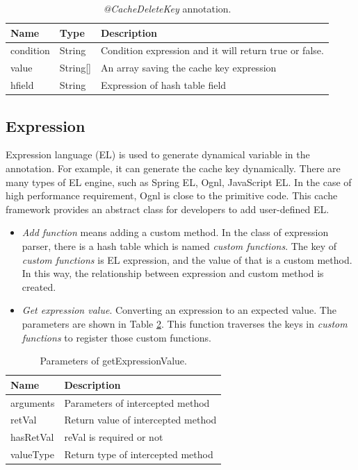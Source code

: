 \documentclass{singlecol-new}
\theoremstyle{TH}{
\newtheorem{lemma}{Lemma}
\newtheorem{theorem}[lemma]{Theorem}
\newtheorem{corrolary}[lemma]{Corrolary}
\newtheorem{conjecture}[lemma]{Conjecture}
\newtheorem{proposition}[lemma]{Proposition}
\newtheorem{claim}[lemma]{Claim}
\newtheorem{stheorem}[lemma]{Wrong Theorem}
}
\theoremstyle{THrm}{
\newtheorem{definition}{Definition}[section]
\newtheorem{question}{Question}[section]
\newtheorem{remark}{Remark}
\newtheorem{scheme}{Scheme}
}
\theoremstyle{THhit}{
\newtheorem{case}{Case}[section]
}
\begin{document}
\begin{table}[htb]
\begin{center}
 \caption{\label{CacheDeleteKey}\textit{@CacheDeleteKey} annotation.}
 \begin{tabular}{lll}
 \toprule
Name & Type & Description\\
 \midrule
condition & String & Condition expression and it will return true or false.\\ %
value & String[] & An array saving the cache key expression\\
hfield & String & Expression of hash table field\\
\bottomrule
 \end{tabular}
\end{center}
\end{table}

\subsection{Expression}
Expression language (EL) is used to generate dynamical variable in the annotation. For example, it can generate the cache key dynamically. There are many types of EL engine, such as Spring EL, Ognl, JavaScript EL. In the case of high performance requirement, Ognl is close to the primitive code. This cache framework provides an abstract class for developers to add user-defined EL.

\begin{itemize}
  \item \textit{Add function} means adding a custom method. In the class of expression parser, there is a hash table which is named \textit{custom functions}. The key of \textit{custom functions} is EL expression, and the value of that is a custom method. In this way, the relationship between expression and custom method is created.
  \item \textit{Get expression value}. Converting an expression to an expected value. The parameters are shown in Table \ref{getExpressionValue}. This function traverses the keys in \textit{custom functions} to register those custom functions.
\end{itemize}

\begin{table}[htb]
\begin{center}
 \caption{\label{getExpressionValue}Parameters of getExpressionValue.}
 \begin{tabular}{ll}
 \toprule
Name & Description\\
 \midrule
arguments & Parameters of intercepted method\\
retVal & Return value of intercepted method\\
hasRetVal & reVal is required or not\\
valueType & Return type of intercepted method\\
\bottomrule
 \end{tabular}
\end{center}
\end{table}
\end{document}

